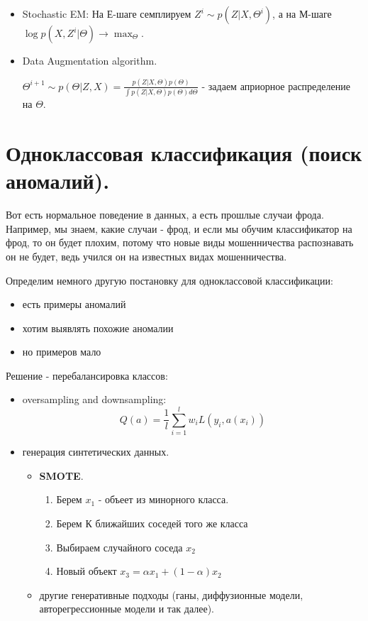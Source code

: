 \documentclass[12pt]{article}
\begin{document}
\begin{itemize}
    \item Stochastic EM:
    На Е-шаге семплируем $Z^i \sim p(Z|X, \Theta^i)$,  а на М-шаге $\log p(X, Z^i|\Theta) \rightarrow \max_\Theta$.

    \item Data Augmentation algorithm.
    
    $\Theta^{i+1} \sim p(\Theta|Z, X) = \frac{p(Z|X, \Theta)p(\Theta)}{\int p(Z|X, \Theta)p(\Theta) d \Theta}$ - задаем априорное распределение на $\Theta$.

\end{itemize}

\section*{Одноклассовая классификация (поиск аномалий).}

Вот есть нормальное поведение в данных, а есть прошлые случаи фрода. Например, мы знаем, какие случаи - фрод, и если мы обучим классификатор на фрод, то он будет плохим, потому что новые виды мошенничества распознавать он не будет, ведь учился он на известных видах мошенничества.

Определим немного другую постановку для одноклассовой классификации:
\begin{itemize}
    \item есть примеры аномалий
    \item хотим выявлять похожие аномалии
    \item но примеров мало
\end{itemize}

Решение  - перебалансировка классов:
\begin{itemize}
    \item oversampling and downsampling:
    \[ Q(a) = \frac{1}{l} \sum_{i=1}^l w_i L(y_i, a(x_i)) \]
    \item генерация синтетических данных.
    \begin{itemize}
        \item \textbf{SMOTE}. 
        \begin{enumerate}
            \item Берем $x_1$ - объеет из минорного класса.
            \item Берем К ближайших соседей того же класса
            \item Выбираем случайного соседа $x_2$
            \item Новый объект $x_3 = \alpha x_1 + (1-\alpha) x_2$
        \end{enumerate}
        \item другие генеративные подходы (ганы, диффузионные модели, авторегрессионные модели и так далее).
    \end{itemize}
\end{itemize}
\end{document}
